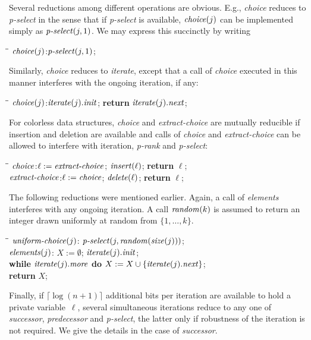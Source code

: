 \documentclass[envcountsame,envcountsect,undated,nolinenumbers]{lnthi}
\def\Tvn#1{\hbox{\textit{#1\/}}}
\def\Tceil#1{\lceil #1\rceil}
\begin{document}
Several reductions among different operations
are obvious.
E.g., \Tvn{choice} reduces to \Tvn{p-select}
in the sense that if \Tvn{p-select} is available,
$\Tvn{choice}(j)$ can be implemented simply as
$\Tvn{p-select}(j,1)$.
We may express this succinctly
by writing

\begin{tabbing}
\quad\=\hskip 3cm\=\kill
\>$\Tvn{choice}(j)$:\>$\Tvn{p-select}(j,1)$;
\end{tabbing}

\noindent
Similarly, \Tvn{choice} reduces to \Tvn{iterate},
except that a call of \Tvn{choice} executed in this
manner interferes with the ongoing iteration, if any:

\begin{tabbing}
\quad\=\hskip 3cm\=\kill
\>$\Tvn{choice}(j)$:\>$\Tvn{iterate}(j).\Tvn{init}$;
 \textbf{return} $\Tvn{iterate}(j).\Tvn{next}$;
\end{tabbing}

\noindent
For colorless data structures,
\Tvn{choice} and \Tvn{extract-choice} are
mutually reducible if insertion and
deletion are available
and calls of 
\Tvn{choice} and \Tvn{extract-choice} can be allowed
to interfere with iteration,
\Tvn{p-rank} and \Tvn{p-select}:

\begin{tabbing}
\quad\=\hskip 3cm\=\kill
\>$\Tvn{choice}$:\>$\ell:=\Tvn{extract-choice}$;
 $\Tvn{insert}(\ell)$; \textbf{return} $\ell$;\\
\>$\Tvn{extract-choice}$:\>$\ell:=\Tvn{choice}$;
 $\Tvn{delete}(\ell)$; \textbf{return} $\ell$;
\end{tabbing}

\noindent
The following reductions were mentioned earlier.
Again, a call of \Tvn{elements} interferes with
any ongoing iteration.
A call $\Tvn{random}(k)$ is assumed to return an integer
drawn uniformly at random from $\{1,\ldots,k\}$.

\begin{tabbing}
\quad\=\hskip 3cm\=\kill
\>$\Tvn{uniform-choice}(j)$:\>
 $\Tvn{p-select}(j,\Tvn{random}(\Tvn{size}(j)))$;\\
\>$\Tvn{elements}(j)$:\>
 $X:=\emptyset$; $\Tvn{iterate}(j).\Tvn{init}$;\\
\>\>\textbf{while} $\Tvn{iterate}(j).\Tvn{more}$
 \textbf{do} $X:=X\cup\{\Tvn{iterate}(j).\Tvn{next}\}$;\\
\>\>\textbf{return} $X$;
\end{tabbing}

\noindent
Finally, if $\Tceil{\log(n+1)}$ additional bits
per iteration are available to hold a
private variable~$\ell$, several simultaneous
iterations reduce to any one of
\Tvn{successor}, \Tvn{predecessor}
and \Tvn{p-select}, the latter only if
robustness of the iteration is not required.
We give the details in the case of \Tvn{successor}.
\end{document}
